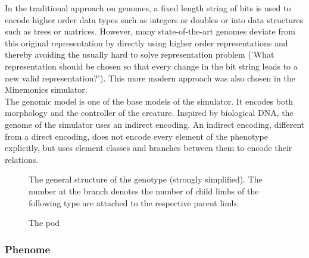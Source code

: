 \documentclass[main]{subfiles}
\begin{document}
In the traditional approach on genomes, a fixed length string of bits is used to encode higher order data types such as integers or doubles or into data structures such as trees or matrices. However, many state-of-the-art genomes deviate from this original representation by directly using higher order representations and thereby avoiding the usually hard to solve representation problem ('What representation should be chosen so that every change in the bit string leads to a new valid representation?'). This more modern approach was also chosen in the Minemonics simulator.\\

The genomic model is one of the base models of the simulator. It encodes both morphology and the controller of the creature. Inspired by biological DNA, the genome of the simulator uses an indirect encoding. An indirect encoding, different from a direct encoding, does not encode every element of the phenotype explicitly, but uses element classes and branches between them to encode their relations. 

\begin{figure}[H]
\center
{}
\caption{The general structure of the genotype (strongly simplified). The number at the branch denotes the number of child limbs of the following type are attached to the respective parent limb.}
\label{figure:genotype}
\end{figure}


\begin{figure}[!h]
\centering
{}
\caption{The pod}
\label{figure:pod}
\end{figure}



\subsubsection{Phenome}
\end{document}
